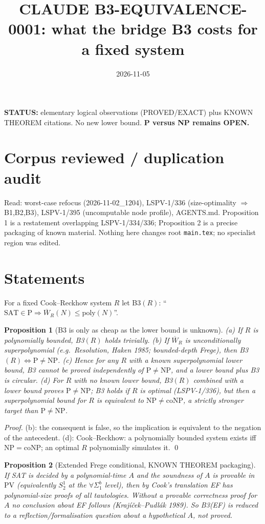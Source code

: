 \documentclass[11pt]{article}
\title{CLAUDE B3-EQUIVALENCE-0001: what the bridge B3 costs for a fixed system}
\date{2026-11-05}
\newtheorem{proposition}{Proposition}
\begin{document}
\maketitle
\noindent\textbf{STATUS:} elementary logical observations (PROVED/EXACT) plus KNOWN THEOREM citations. No new lower bound. \textbf{P versus NP remains OPEN.}

\section*{Corpus reviewed / duplication audit}
Read: worst-case refocus (2026-11-02\_1204), LSPV-1/336 (size-optimality $\Rightarrow$ B1,B2,B3), LSPV-1/395 (uncomputable node profile), AGENTS.md. Proposition 1 is a restatement overlapping LSPV-1/334/336; Proposition 2 is a precise packaging of known material. Nothing here changes root \texttt{main.tex}; no specialist region was edited.

\section*{Statements}
For a fixed Cook--Reckhow system $R$ let B3$(R)$: ``$\mathrm{SAT}\in\mathrm P\Rightarrow\overline W_R(N)\le\mathrm{poly}(N)$''.

\begin{proposition}[B3 is only as cheap as the lower bound is unknown]
(a) If $R$ is polynomially bounded, B3$(R)$ holds trivially. (b) If $\overline W_R$ is \emph{unconditionally} superpolynomial (e.g.\ Resolution, Haken 1985; bounded-depth Frege), then B3$(R)\iff \mathrm P\ne\mathrm{NP}$. (c) Hence for any $R$ with a known superpolynomial lower bound, B3 cannot be proved independently of $\mathrm P\neq\mathrm{NP}$, and a lower bound plus B3 is circular. (d) For $R$ with no known lower bound, B3$(R)$ combined with a lower bound proves $\mathrm P\ne\mathrm{NP}$; B3 holds if $R$ is optimal (LSPV-1/336), but then a superpolynomial bound for $R$ is equivalent to $\mathrm{NP}\ne\mathrm{coNP}$, a strictly stronger target than $\mathrm P\ne\mathrm{NP}$.
\end{proposition}
\begin{proof}
(b): the consequent is false, so the implication is equivalent to the negation of the antecedent. (d): Cook--Reckhow: a polynomially bounded system exists iff $\mathrm{NP}=\mathrm{coNP}$; an optimal $R$ polynomially simulates it. \qed
\end{proof}

\begin{proposition}[Extended Frege conditional, KNOWN THEOREM packaging]
If SAT is decided by a polynomial-time $A$ and the soundness of $A$ is provable in $\mathrm{PV}$ (equivalently $S^1_2$ at the $\forall\Sigma^b_1$ level), then by Cook's translation EF has polynomial-size proofs of all tautologies. Without a provable correctness proof for $A$ no conclusion about EF follows (Krajíček--Pudlák 1989). So B3(EF) is reduced to a reflection/formalisation question about a hypothetical $A$, not proved.
\end{proposition}
\end{document}
